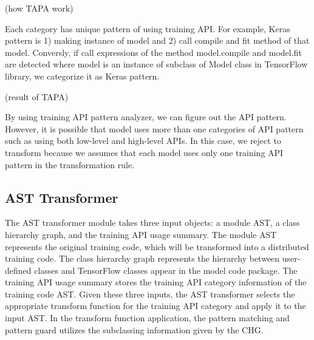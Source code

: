 (how TAPA work)

Each category has unique pattern of using training API.
For example, Keras pattern is 1) making instance of model and
2) call compile and fit method of that model.
Conversly, if call expressions of the method model.compile and model.fit are detected
where model is an instance of subclass of Model class in TensorFlow library,
we categorize it as Keras pattern.

(result of TAPA)

By using training API pattern analyzer, we can figure out the API pattern.
However, it is possible that model uses more than one categories of API pattern
such as using both low-level and high-level APIs.
In this case, we reject to transform because we assumes
that each model uses only one training API pattern in the transformation rule.

\subsection{AST Transformer}

The AST transformer module takes three input objects: a module AST,
a class hierarchy graph, and the training API usage summary.
The module AST represents the original training code, which will
be transformed into a distributed training code.
The class hierarchy graph represents the hierarchy between
user-defined classes and TensorFlow classes appear in the model code package.
The training API usage summary stores the training API category
information of the training code AST. Given these three inputs,
the AST transformer selects the appropriate transform function
for the training API category and apply it to the input AST.
In the transform function application, the pattern matching
and pattern guard utilizes the subclassing information
given by the CHG. 

